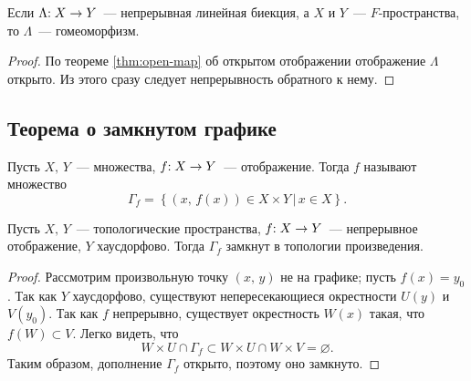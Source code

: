 \documentclass{notes}
\begin{document}
	\begin{cor}\label{cor:ban}
		Если $\Lambda\text{\text{:}} \; X \to Y$~--- непрерывная линейная биекция, а $X$ и $Y$~--- $F$-пространства, то $\Lambda$~--- гомеоморфизм.
		\begin{proof}
			По теореме \ref{thm:open-map} об открытом отображении отображение $\Lambda$ открыто. Из этого сразу следует непрерывность обратного к нему.
		\end{proof}
	\end{cor}

\subsection{Теорема о замкнутом графике}

	\begin{de}
		Пусть $X, \, Y$~--- множества, $f\text{\text{:}}\; X \to Y$~--- отображение. Тогда  $f$ называют множество
		\[
			\Gamma_f = \left\{(x, \, f(x)) \in X \times Y \, \big |\, x \in X\right\}.
		\]
	\end{de}

	\begin{st}
		Пусть $X, \, Y$~--- топологические пространства, $f\text{\text{:}}\; X \to Y$~--- непрерывное отображение, $Y$ хаусдорфово. Тогда $\Gamma_f$ замкнут в топологии произведения.
		\begin{proof}
			Рассмотрим произвольную точку $(x, \, y)$ не на графике; пусть $f(x) = y_0$. Так как $Y$ хаусдорфово, существуют непересекающиеся окрестности $U(y)$ и $V(y_0)$. Так как $f$ непрерывно, существует окрестность $W(x)$ такая, что $f(W) \subset V$. Легко видеть, что
			\[
				W \times U \cap \Gamma_f \subset W \times U \cap W \times V = \varnothing.
			\]
			Таким образом, дополнение $\Gamma_f$ открыто, поэтому оно замкнуто.
		\end{proof}
	\end{st}
\end{document}
